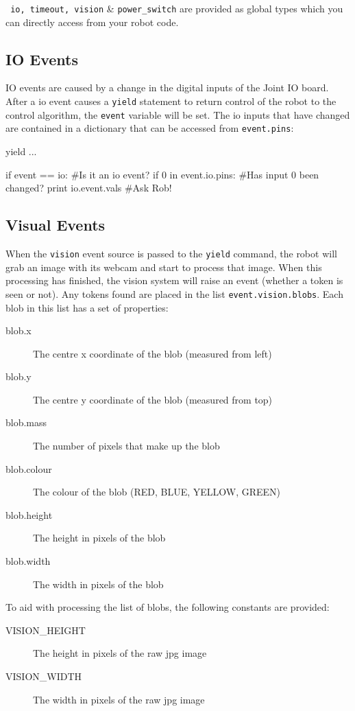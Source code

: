 \documentclass[a4paper, 12pt]{article}
\begin{document}
\texttt{ io, timeout, vision} \& \texttt{power\_switch} are provided as global types which you can directly access from your robot code.

\subsection{IO Events}
IO events are caused by a change in the digital inputs of the
Joint IO board. After a io event causes a \texttt{yield} statement to
return control of the robot to the control algorithm, the
\texttt{event} variable will be set. The io inputs that have changed
are contained in a dictionary that can be accessed from \texttt{event.pins}: 

\begin{verbatimtab}
yield ...

if event == io:			#Is it an io event?
    if 0 in event.io.pins:     	#Has input 0 been changed?
        print io.event.vals 	#Ask Rob!
\end{verbatimtab}


\subsection{Visual Events}
When the \texttt{vision} event source is passed to the \texttt{yield}
command, the robot will grab an image with its webcam and start to
process that image.  When this processing has finished, the vision
system will raise an event (whether a token is seen or not).  Any
tokens found are placed in the list \texttt{event.vision.blobs}.  Each blob in this
list has a set of properties:  
\begin{description}
\item[blob.x] The centre x coordinate of the blob (measured from left)
\item[blob.y] The centre y coordinate of the blob (measured from top)
\item[blob.mass] The number of pixels that make up the blob
\item[blob.colour] The colour of the blob (RED, BLUE, YELLOW, GREEN)
\item[blob.height] The height in pixels of the blob
\item[blob.width] The width in pixels of the blob
\end{description}

To aid with processing the list of blobs, the following constants are provided:
\begin{description}
\item[VISION\_HEIGHT] The height in pixels of the raw jpg image
\item[VISION\_WIDTH] The width in pixels of the raw jpg image
\end{description}
\end{document}
